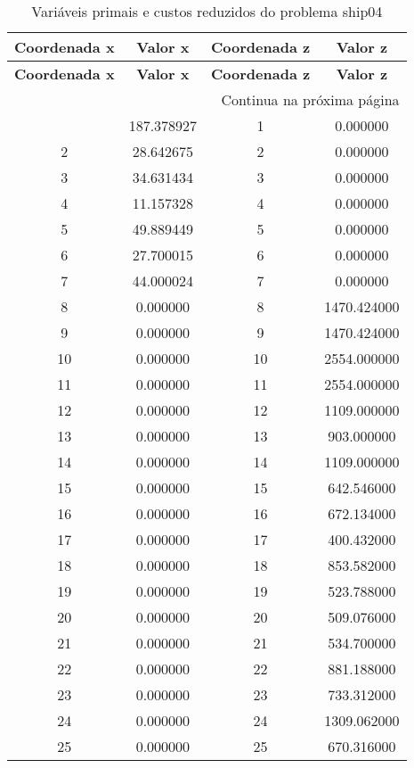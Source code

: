 \documentclass[12pt]{article}
\begin{document}
\begin{longtable}{@{}cccc@{}}
\caption{Variáveis primais e custos reduzidos do problema ship04} \\
\toprule
\textbf{Coordenada x} & \textbf{Valor x} & \textbf{Coordenada z} & \textbf{Valor z} \\
\midrule
\endfirsthead

\toprule
\textbf{Coordenada x} & \textbf{Valor x} & \textbf{Coordenada z} & \textbf{Valor z} \\
\midrule
\endhead

\midrule \multicolumn{4}{r}{{Continua na próxima página}} \\ \midrule
\endfoot

\bottomrule
\endlastfoot
1 & 187.378927 & 1 & 0.000000 \\
2 & 28.642675 & 2 & 0.000000 \\
3 & 34.631434 & 3 & 0.000000 \\
4 & 11.157328 & 4 & 0.000000 \\
5 & 49.889449 & 5 & 0.000000 \\
6 & 27.700015 & 6 & 0.000000 \\
7 & 44.000024 & 7 & 0.000000 \\
8 & 0.000000 & 8 & 1470.424000 \\
9 & 0.000000 & 9 & 1470.424000 \\
10 & 0.000000 & 10 & 2554.000000 \\
11 & 0.000000 & 11 & 2554.000000 \\
12 & 0.000000 & 12 & 1109.000000 \\
13 & 0.000000 & 13 & 903.000000 \\
14 & 0.000000 & 14 & 1109.000000 \\
15 & 0.000000 & 15 & 642.546000 \\
16 & 0.000000 & 16 & 672.134000 \\
17 & 0.000000 & 17 & 400.432000 \\
18 & 0.000000 & 18 & 853.582000 \\
19 & 0.000000 & 19 & 523.788000 \\
20 & 0.000000 & 20 & 509.076000 \\
21 & 0.000000 & 21 & 534.700000 \\
22 & 0.000000 & 22 & 881.188000 \\
23 & 0.000000 & 23 & 733.312000 \\
24 & 0.000000 & 24 & 1309.062000 \\
25 & 0.000000 & 25 & 670.316000 \\

\end{longtable}
\end{document}
